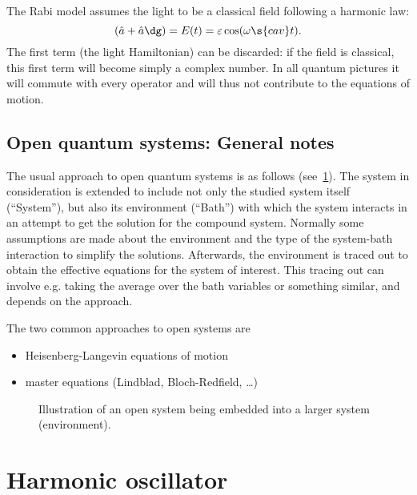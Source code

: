 \documentclass[fontsize=9pt,bookmarkpackage=false]{scrartcl}
\newcommand{\inputtikz}[1]{%
  \tikzsetnextfilename{#1}%
}
\begin{document}
The Rabi model assumes the light to be a classical field following a harmonic law:
\begin{equation}
  ( \hat a + \hat a\dg ) = E(t) = \varepsilon \cos ( \omega\s{cav} t  ).
\end{equation}
The first term (the light Hamiltonian) can be discarded: if the field is classical, this first term will become simply a complex number.
In all quantum pictures it will commute with every operator and will thus not contribute to the equations of motion.

\subsection{Open quantum systems: General notes} %
\label{sec:open_quantum_systems}

The usual approach to open quantum systems is as follows (see~\cref{fig:opensys}).
The system in consideration is extended to include not only the studied system itself (``System''), but also its environment (``Bath'') with which the system interacts in an attempt to get the solution for the compound system.
Normally some assumptions are made about the environment and the type of the system-bath interaction to simplify the solutions.
Afterwards, the environment is traced out to obtain the effective equations for the system of interest.
This tracing out can involve e.g. taking the average over the bath variables or something similar, and depends on the approach.

The two common approaches to open systems are
\begin{itemize}
  \tightlist
  \item Heisenberg-Langevin equations of motion
  \item master equations (Lindblad, Bloch-Redfield, \dots)
\end{itemize}

\begin{figure}[htb]
  \centering
  \inputtikz{open_systems}
  \caption{Illustration of an open system being embedded into a larger system (environment).}
  \label{fig:opensys}
\end{figure}




\cleardoublepage

\appendix
\appendixpage
\addappheadtotoc

\section{Harmonic oscillator} %
\label{sec:harmonic_oscillator}
\end{document}
